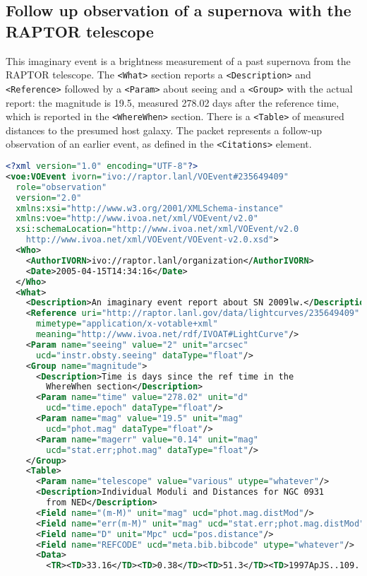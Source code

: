 \documentclass[11pt,a4paper]{ivoa}
\begin{document}
\subsection{Follow up observation of a supernova with the RAPTOR telescope}
This imaginary event is a brightness measurement of a past supernova from the
RAPTOR \citep{bib10} telescope. The \verb|<What>| section reports a
\verb|<Description>| and \verb|<Reference>| followed by a \verb|<Param>| about seeing
and a \verb|<Group>| with the actual report: the magnitude is 19.5, measured
278.02 days after the reference time, which is reported in the
\verb|<WhereWhen>| section. There is a \verb|<Table>| of measured distances to the
presumed host galaxy. The packet represents a follow-up observation of an
earlier event, as defined in the \verb|<Citations>| element.
\begin{lstlisting}[language=XML]
<?xml version="1.0" encoding="UTF-8"?>
<voe:VOEvent ivorn="ivo://raptor.lanl/VOEvent#235649409"
  role="observation"
  version="2.0"
  xmlns:xsi="http://www.w3.org/2001/XMLSchema-instance"
  xmlns:voe="http://www.ivoa.net/xml/VOEvent/v2.0"
  xsi:schemaLocation="http://www.ivoa.net/xml/VOEvent/v2.0
    http://www.ivoa.net/xml/VOEvent/VOEvent-v2.0.xsd">
  <Who>
    <AuthorIVORN>ivo://raptor.lanl/organization</AuthorIVORN>
    <Date>2005-04-15T14:34:16</Date>
  </Who>
  <What>
    <Description>An imaginary event report about SN 2009lw.</Description>
    <Reference uri="http://raptor.lanl.gov/data/lightcurves/235649409"
      mimetype="application/x-votable+xml"
      meaning="http://www.ivoa.net/rdf/IVOAT#LightCurve"/>
    <Param name="seeing" value="2" unit="arcsec"
      ucd="instr.obsty.seeing" dataType="float"/>
    <Group name="magnitude">
      <Description>Time is days since the ref time in the
        WhereWhen section</Description>
      <Param name="time" value="278.02" unit="d"
        ucd="time.epoch" dataType="float"/>
      <Param name="mag" value="19.5" unit="mag"
        ucd="phot.mag" dataType="float"/>
      <Param name="magerr" value="0.14" unit="mag"
        ucd="stat.err;phot.mag" dataType="float"/>
    </Group>
    <Table>
      <Param name="telescope" value="various" utype="whatever"/>
      <Description>Individual Moduli and Distances for NGC 0931
        from NED</Description>
      <Field name="(m-M)" unit="mag" ucd="phot.mag.distMod"/>
      <Field name="err(m-M)" unit="mag" ucd="stat.err;phot.mag.distMod"/>
      <Field name="D" unit="Mpc" ucd="pos.distance"/>
      <Field name="REFCODE" ucd="meta.bib.bibcode" utype="whatever"/>
      <Data>
        <TR><TD>33.16</TD><TD>0.38</TD><TD>51.3</TD><TD>1997ApJS..109..333W</TD></TR>

\end{lstlisting}
\end{document}
